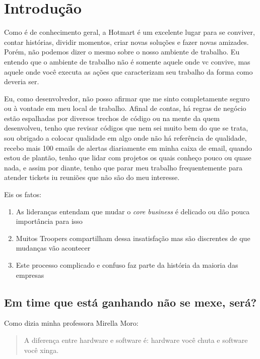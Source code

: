 \chapter{Introdução}


Como é de conhecimento geral, a Hotmart é um excelente lugar para se conviver, contar histórias, dividir momentos, criar novas soluções e fazer novas amizades. Porém, não podemos dizer o mesmo sobre o nosso ambiente de trabalho. Eu entendo que o ambiente de trabalho não é somente aquele onde vc convive, mas aquele onde você executa as ações que caracterizam seu trabalho da forma como deveria ser.

Eu, como desenvolvedor, não posso afirmar que me sinto completamente seguro ou à vontade em meu local de trabalho. Afinal de contas, há regras de negócio estão espalhadas por diversos trechos de código ou na mente da quem desenvolveu, tenho que revisar códigos que nem sei muito bem do que se trata, sou obrigado a colocar qualidade em algo onde não há referência de qualidade, recebo mais 100 emails de alertas diariamente em minha caixa de email, quando estou de plantão, tenho que lidar com projetos os quais conheço pouco ou quase nada, e assim por diante, tenho que parar meu trabalho frequentemente para atender tickets iu reuniões que não são do meu interesse. 

Eis os fatos:
\begin{enumerate}
    \item As lideranças entendam que mudar o \emph{core business} é delicado ou dão pouca importância para isso
    \item Muitos Troopers compartilham dessa insatisfação mas são discrentes de que mudanças vão acontecer
    \item Este processo complicado e confuso faz parte da história da maioria das empresas
\end{enumerate}

\section{Em time que está ganhando não se mexe, será?}
Como dizia minha professora Mirella Moro: 
\begin{quote}
A diferença entre hardware e software é: hardware você chuta e software você xinga.
\end{quote}



